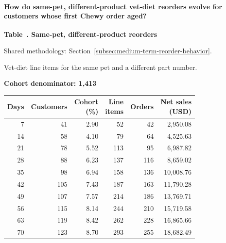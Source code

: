 \paragraph{How do same-pet, different-product vet-diet reorders evolve for customers whose first Chewy order aged?}

\label{tab:financial-opportunity-new-chewy-same-pet-different-part}
\par\smallskip\noindent\parbox[t][2\baselineskip][t]{\linewidth}{\raggedright\textbf{Table~\thetable. Same-pet, different-product reorders}}
\par\raggedright\footnotesize Shared methodology: Section~\ref{subsec:medium-term-reorder-behavior}.
\par\noindent\parbox[t][2\baselineskip][t]{\linewidth}{\raggedright Vet-diet line items for the same pet and a different part number.}
\par\noindent\textbf{Cohort denominator: 1,413}
\par\centering\footnotesize
\setlength{\tabcolsep}{2pt}
\begin{tabular}{rrrrrr}\toprule
Days & Customers & \shortstack{Cohort\\(\%)} & \shortstack{Line\\items} & Orders & \shortstack{Net sales\\(USD)} \\ \midrule

7 & 41 & 2.90 & 52 & 42 & 2,950.08 \\

14 & 58 & 4.10 & 79 & 64 & 4,525.63 \\

21 & 78 & 5.52 & 113 & 95 & 6,987.82 \\

28 & 88 & 6.23 & 137 & 116 & 8,659.02 \\

35 & 98 & 6.94 & 158 & 136 & 10,008.76 \\

42 & 105 & 7.43 & 187 & 163 & 11,790.28 \\

49 & 107 & 7.57 & 214 & 186 & 13,769.71 \\

56 & 115 & 8.14 & 244 & 210 & 15,719.58 \\

63 & 119 & 8.42 & 262 & 228 & 16,865.66 \\

70 & 123 & 8.70 & 293 & 255 & 18,682.49 \\
\bottomrule\end{tabular}\par

